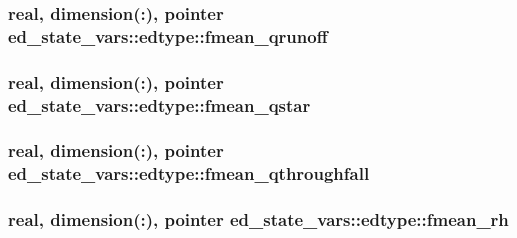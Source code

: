 \subsubsection[{\texorpdfstring{fmean\+\_\+qrunoff}{fmean_qrunoff}}]{\setlength{\rightskip}{0pt plus 5cm}real, dimension(\+:), pointer ed\+\_\+state\+\_\+vars\+::edtype\+::fmean\+\_\+qrunoff}\hypertarget{structed__state__vars_1_1edtype_a9f7d1305fbc15f424d0a742d0ed7b565}{}\label{structed__state__vars_1_1edtype_a9f7d1305fbc15f424d0a742d0ed7b565}
\subsubsection[{\texorpdfstring{fmean\+\_\+qstar}{fmean_qstar}}]{\setlength{\rightskip}{0pt plus 5cm}real, dimension(\+:), pointer ed\+\_\+state\+\_\+vars\+::edtype\+::fmean\+\_\+qstar}\hypertarget{structed__state__vars_1_1edtype_a52b73e1b1894d204678c0e4786d4d2ef}{}\label{structed__state__vars_1_1edtype_a52b73e1b1894d204678c0e4786d4d2ef}
\subsubsection[{\texorpdfstring{fmean\+\_\+qthroughfall}{fmean_qthroughfall}}]{\setlength{\rightskip}{0pt plus 5cm}real, dimension(\+:), pointer ed\+\_\+state\+\_\+vars\+::edtype\+::fmean\+\_\+qthroughfall}\hypertarget{structed__state__vars_1_1edtype_af043a84200872866ea5950189e519986}{}\label{structed__state__vars_1_1edtype_af043a84200872866ea5950189e519986}
\subsubsection[{\texorpdfstring{fmean\+\_\+rh}{fmean_rh}}]{\setlength{\rightskip}{0pt plus 5cm}real, dimension(\+:), pointer ed\+\_\+state\+\_\+vars\+::edtype\+::fmean\+\_\+rh}\hypertarget{structed__state__vars_1_1edtype_af58a739971439c227f9eb54b4c469189}{}\label{structed__state__vars_1_1edtype_af58a739971439c227f9eb54b4c469189}
